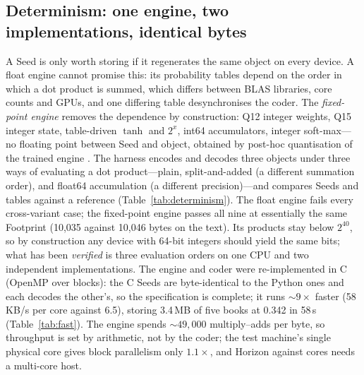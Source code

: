 \documentclass[11pt,a4paper]{article}
\theoremstyle{definition}
\theoremstyle{plain}
\theoremstyle{remark}
\begin{document}
\subsection{Determinism: one engine, two implementations, identical bytes}
\label{sec:determinism}
A Seed is only worth storing if it regenerates the same object on every device. A float engine
cannot promise this: its probability tables depend on the order in which a dot product is
summed, which differs between BLAS libraries, core counts and GPUs, and one differing table
desynchronises the coder. The \emph{fixed-point engine} removes the dependence by construction:
Q12 integer weights, Q15 integer state, table-driven $\tanh$ and $2^{x}$, int64 accumulators,
integer soft-max---no floating point between Seed and object, obtained by post-hoc quantisation
of the trained engine \citep{jacob2018}. The harness encodes and decodes three objects under
three ways of evaluating a dot product---plain, split-and-added (a different summation order),
and float64 accumulation (a different precision)---and compares Seeds and tables against a
reference (Table~\ref{tab:determinism}). The float engine fails every cross-variant case; the
fixed-point engine passes all nine at essentially the same Footprint (10,035 against 10,046 bytes
on the text). Its products stay below $2^{40}$, so by construction any device with 64-bit integers
should yield the same bits; what has been \emph{verified} is three evaluation orders on one CPU and
two independent implementations. The engine and coder were re-implemented in C (OpenMP over
blocks): the C Seeds are byte-identical to the Python ones and each decodes the other's, so the
specification is complete; it runs ${\sim}9\times$ faster (58\,KB/s per core against 6.5),
storing 3.4\,MB of five books at 0.342 in 58\,s (Table~\ref{tab:fast}). The engine spends
${\sim}49{,}000$ multiply--adds per byte, so throughput is set by arithmetic, not by the coder; the
test machine's single physical core gives block parallelism only $1.1\times$, and Horizon against
cores needs a multi-core host.



\begin{table}[!htb]
\centering\small
\caption{Cross-arithmetic determinism, three objects (text, Python, PNG). Cells are objects
passing out of three; PASS = identical Seed and bit-exact regeneration of the reference Seed.}
\label{tab:determinism}
{\footnotesize\setlength{\tabcolsep}{4pt}\detTable{}}
\end{table}
\end{document}
